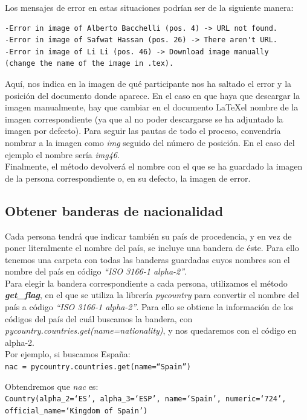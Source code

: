 \documentclass[a4paper, 12pt]{book}
\begin{document}
Los mensajes de error en estas situaciones podrían ser de la siguiente manera:
\begin{verbatim}
-Error in image of Alberto Bacchelli (pos. 4) -> URL not found.
-Error in image of Safwat Hassan (pos. 26) -> There aren't URL.
-Error in image of Li Li (pos. 46) -> Download image manually
(change the name of the image in .tex).
\end{verbatim}
Aquí, nos indica en la imagen de qué participante nos ha saltado el error y la posición del documento donde aparece. En el caso en que haya que descargar la imagen manualmente, hay que cambiar en el documento \LaTeX el nombre de la imagen correspondiente (ya que al no poder descargarse se ha adjuntado la imagen por defecto). Para seguir las pautas de todo el proceso, convendría nombrar a la imagen como \textit{img} seguido del número de posición. En el caso del ejemplo el nombre sería \textit{img46}.\\

Finalmente, el método devolverá el nombre con el que se ha guardado la imagen de la persona correspondiente o, en su defecto, la imagen de error.


\subsection{Obtener banderas de nacionalidad}
\label{subsec:banderas}
Cada persona tendrá que indicar también su país de procedencia, y en vez de poner literalmente el nombre del país, se incluye una bandera de éste. Para ello tenemos una carpeta con todas las banderas guardadas cuyos nombres son el nombre del país en código \textit{``ISO 3166-1 alpha-2''}.\\

Para elegir la bandera correspondiente a cada persona, utilizamos el método \textbf{\textit{get\_flag}}, en el que se utiliza la librería \textit{pycountry} para convertir el nombre del país a código \textit{``ISO 3166-1 alpha-2''}. Para ello se obtiene la información de los códigos del país del cuál buscamos la bandera, con \textit{pycountry.countries.get(name=nationality)}, y nos quedaremos con el código en alpha-2.\\

Por ejemplo, si buscamos España:\\
\texttt{nac = pycountry.countries.get(name=``Spain'')}

Obtendremos que \textit{nac} es:\\
\texttt{Country(alpha\_2=`ES', alpha\_3=`ESP', name=`Spain', numeric=`724', official\_name=`Kingdom of Spain')}
\end{document}
